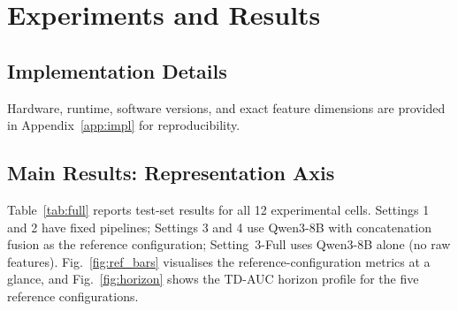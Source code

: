 \section{Experiments and Results}

\subsection{Implementation Details}
Hardware, runtime, software versions, and exact feature dimensions are
provided in Appendix~\ref{app:impl} for reproducibility.

\subsection{Main Results: Representation Axis}

Table~\ref{tab:full} reports test-set results for all 12 experimental cells.
Settings 1 and 2 have fixed pipelines; Settings 3 and 4 use Qwen3-8B with
concatenation fusion as the reference configuration; Setting~3-Full uses
Qwen3-8B alone (no raw features).
Fig.~\ref{fig:ref_bars} visualises the reference-configuration metrics at a
glance, and Fig.~\ref{fig:horizon} shows the TD-AUC horizon profile for the
five reference configurations.


